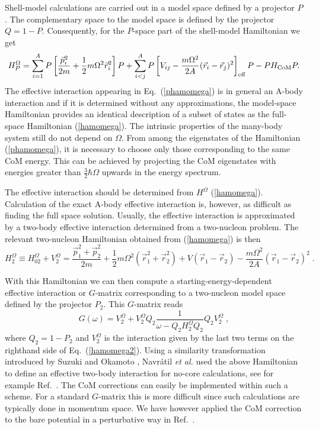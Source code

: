 \documentclass[twoside,12pt]{article}
\begin{document}
% 
Shell-model calculations are carried out in a model space defined
by a projector $P$. 
The complementary space to the model space
is defined by the projector $Q=1-P$. Consequently, for the $P$-space
part of the shell-model Hamiltonian we get
%
\begin{equation}\label{phamomega}
H^\Omega_P=\sum_{i=1}^A P\left[ \frac{\vec{p}_i^2}{2m}
+\frac{1}{2}m\Omega^2 \vec{r}^2_i
\right]P + \sum_{i<j}^A P\left[ V_{ij}-\frac{m\Omega^2}{2A}
(\vec{r}_i-\vec{r}_j)^2
\right]_{\rm eff} P -PH_{\mathrm{CoM}}P.
\end{equation}
%
The effective interaction appearing in Eq.~(\ref{phamomega}) is in general
an A-body interaction and if it is determined without any approximations,
the model-space Hamiltonian provides an identical description 
of a subset of states as the full-space Hamiltonian (\ref{hamomega}).
The intrinsic properties of the many-body system still do not depend
on $\Omega$. From among the eigenstates of the Hamiltonian 
(\ref{phamomega}),
it is necessary to choose only those corresponding to the same 
CoM energy. This can be achieved by projecting 
the CoM eigenstates
with energies greater than $\frac{3}{2}\hbar\Omega$ upwards in the
energy spectrum. 


The effective interaction should be determined from $H^\Omega$ 
(\ref{hamomega}). Calculation of the exact A-body effective
interaction is, however, as difficult as finding the full space solution.
Usually, the effective interaction is approximated by a 
two-body effective interaction determined from a two-nucleon
problem. The relevant two-nucleon Hamiltonian 
obtained from (\ref{hamomega}) is then
%
\begin{equation}\label{hamomega2}
H^\Omega_2\equiv H^\Omega_{02}+V_2^\Omega=
\frac{\vec{p}_1^2+\vec{p}_2^2}{2m}
+\frac{1}{2}m\Omega^2 (\vec{r}^2_1+\vec{r}^2_2)
+ V(\vec{r}_1-\vec{r}_2)-\frac{m\Omega^2}{2A}(\vec{r}_1-\vec{r}_2)^2 \; .
\end{equation}
%

With this Hamiltonian we can then compute a
starting-energy-dependent effective interaction 
or $G$-matrix corresponding to a two-nucleon model
space defined by the projector $P_2$. This $G$-matrix reads
%
\begin{equation}\label{G}
G(\omega) = V_2^\Omega 
+ V_2^\Omega Q_2 \frac{1}{\omega-Q_2H_2^\Omega Q_2} 
Q_2 V_2^\Omega \; ,
\end{equation}
%  
where $Q_2=1-P_2$ and $V_2^\Omega$ is the interaction given by the last 
two terms on the righthand side of Eq.~(\ref{hamomega2}).
Using a similarity transformation introduced by Suzuki and Okamoto \cite{so95},
Navr\'atil {\em et al.} used the above Hamiltonian to define an effective two-body
interaction for no-core calculations, see for example Ref.~\cite{petr_erich2002}. 
The CoM corrections can easily be implemented within such a scheme.
For a standard $G$-matrix this is more difficult since such calculations are typically
done in momentum space. We have however applied the CoM correction to the 
bare potential in a perturbative way in Ref.~\cite{dean03}. 
\end{document}
